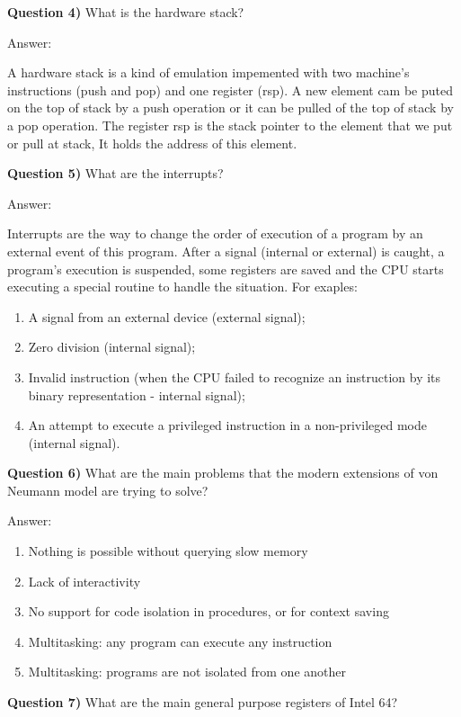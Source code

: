\documentclass[11pt, a4paper]{amsart}
\numberwithin{equation}{section}
\theoremstyle{plain} %
\theoremstyle{definition}
\theoremstyle{remark}
\begin{document}
\textbf{Question 4)} What is the hardware stack?

Answer:

	A hardware stack is a kind of emulation impemented with two machine's instructions (push and pop) and one register (rsp). A new
element cam be puted on the top of stack by a push operation or it can be pulled of the top of stack by a pop operation. The register
rsp is the stack pointer to the element that we put or pull at stack, It holds the address of this element.

\textbf{Question 5)} What are the interrupts?

Answer:

	Interrupts are the way to change the order of execution of a program by an external event of this program. After a signal
(internal or external) is caught, a program's execution is suspended, some registers are saved and the CPU starts executing a special
routine to handle the situation. For exaples:
\begin{enumerate}
    \item A signal from an external device (external signal);
	\item Zero division (internal signal);
	\item Invalid instruction (when the CPU failed to recognize an instruction by its binary representation - internal signal);
	\item An attempt to execute a privileged instruction in a non-privileged mode (internal signal).
\end{enumerate}

\textbf{Question 6)} What are the main problems that the modern extensions of von Neumann model are trying to solve?

Answer:

\begin{enumerate}
    \item Nothing is possible without querying slow memory
    \item Lack of interactivity
    \item No support for code isolation in procedures, or for context saving
    \item Multitasking: any program can execute any instruction
    \item Multitasking: programs are not isolated from one another
\end{enumerate}
    
\textbf{Question 7)} What are the main general purpose registers of Intel 64?
\end{document}
